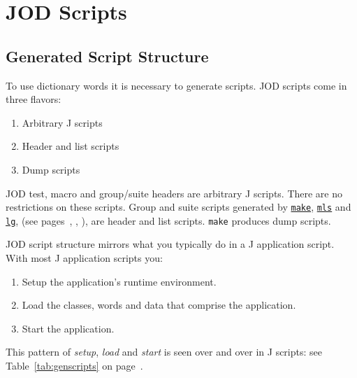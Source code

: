 
\section{JOD Scripts}

\subsection{Generated Script Structure}\label{ss:genscripts}

To use dictionary words it is necessary to generate scripts.  JOD scripts come in three flavors:
\begin{enumerate}
	\item Arbitrary J scripts 
  \item Header and list scripts
  \item Dump scripts
\end{enumerate}

JOD test, macro and group/suite headers are arbitrary J scripts.  There are no restrictions on 
these scripts.  Group and suite scripts generated by 
\hyperlink{il:make}{\texttt{make}}, \hyperlink{il:mls}{\texttt{mls}} and 
\hyperlink{il:lg}{\texttt{lg}}, (see pages~\pageref{ss:make}, \pageref{ss:mls},
\pageref{ss:lg}), are header and list scripts.  \texttt{make} produces dump scripts.  

JOD script structure mirrors what you typically do in a J application script.  With most J application scripts you: 
\begin{enumerate}
	\item Setup the application's runtime environment.
	\item Load the classes, words and data that comprise the application.
	\item Start the application.
\end{enumerate}

This pattern of \emph{setup}, \emph{load} and \emph{start} is seen over and over in J scripts: see  
Table~\ref{tab:genscripts} on page~\pageref{tab:genscripts}.

